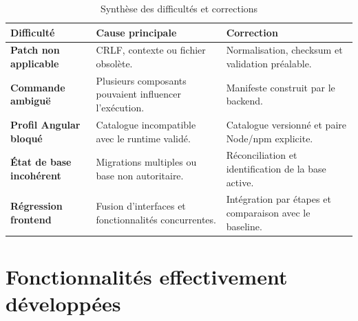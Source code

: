 \begin{table}[H]
    \centering
    \small
    \begin{tabularx}{\textwidth}{|>{\bfseries\RaggedRight\arraybackslash}p{3.8cm}|>{\RaggedRight\arraybackslash}p{4.6cm}|>{\RaggedRight\arraybackslash}X|}
        \hline
        \rowcolor{cgilight!95}
        \textbf{Difficulté} & \textbf{Cause principale} & \textbf{Correction} \\
        \hline
        Patch non applicable & CRLF, contexte ou fichier obsolète. & Normalisation, checksum et validation préalable. \\
        \hline
        Commande ambiguë & Plusieurs composants pouvaient influencer l'exécution. & Manifeste construit par le backend. \\
        \hline
        Profil Angular bloqué & Catalogue incompatible avec le runtime validé. & Catalogue versionné et paire Node/npm explicite. \\
        \hline
        État de base incohérent & Migrations multiples ou base non autoritaire. & Réconciliation et identification de la base active. \\
        \hline
        Régression frontend & Fusion d'interfaces et fonctionnalités concurrentes. & Intégration par étapes et comparaison avec le baseline. \\
        \hline
    \end{tabularx}
    \caption{Synthèse des difficultés et corrections}
    \label{tab:difficultes-corrections-ch4}
\end{table}

\section{Fonctionnalités effectivement développées}

